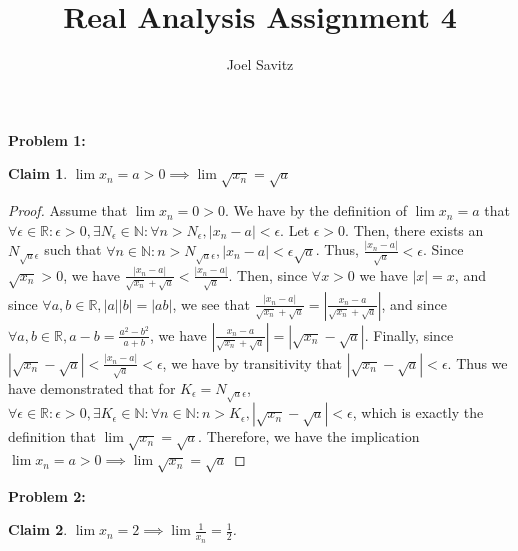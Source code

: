 \documentclass{article}
\title{Real Analysis Assignment 4}
\author{Joel Savitz}
\newcommand{\reals}{\ensuremath{\mathbb{R}}}
\newcommand{\nats}{\ensuremath{\mathbb{N}}}
\newcommand{\eps}{\ensuremath{\epsilon}}
\newtheorem{clm}{Claim}
\begin{document}
\maketitle

\textbf{Problem 1:}

\begin{clm}
	$\lim x_n = a > 0 \implies \lim \sqrt{x_n} = \sqrt{a}$
\end{clm}

\begin{proof}
	Assume that $\lim x_n = 0 > 0$.
	We have by the definition of $\lim x_n = a$
	that $\forall \eps \in \reals : \eps > 0, \exists N_\eps \in \nats: \forall n > N_\eps, | x_n - a | < \eps$.
	Let $\eps > 0$.
	Then, there exists an $N_{\sqrt{a}\eps}$
	such that $\forall n \in \nats : n > N_{\sqrt{a}\eps}, | x_n - a | < \eps \sqrt{a}$.
	Thus, $\frac{|x_n - a|}{\sqrt{a}} < \eps$.
	Since $\sqrt{x_n} > 0$, we have 
	$\frac{|x_n - a|}{\sqrt{x_n} + \sqrt{a}} < \frac{|x_n - a|}{\sqrt{a}}$.
	Then, since $\forall x > 0$ we have $|x| = x$,
	and since $\forall a,b \in \reals, |a||b| = |ab|$,
	we see that 
	$\frac{|x_n - a|}{\sqrt{x_n} + \sqrt{a}} = |\frac{x_n - a}{\sqrt{x_n} + \sqrt{a}}|$,
	and since $\forall a, b \in \reals, a - b = \frac{a^2 - b^2}{a + b}$,
	we have $|\frac{x_n - a}{\sqrt{x_n} + \sqrt{a}}| = | \sqrt{x_n} - \sqrt{a} |$.
	Finally, since $| \sqrt{x_n} - \sqrt{a} | < \frac{|x_n - a|}{\sqrt{a}}	< \eps$,
	we have by transitivity that $| \sqrt{x_n} - \sqrt{a} | < \eps$.
	Thus we have demonstrated that
	for $K_\eps = N_{\sqrt{a}\eps}$,
	$\forall \eps \in \reals: \eps > 0, \exists K_\eps \in \nats: \forall n \in \nats: n > K_\eps,
	| \sqrt{x_n} - \sqrt{a} | < \eps$,
	which is exactly the definition that $\lim \sqrt{x_n} = \sqrt{a}$.
	Therefore, we have the implication $\lim x_n = a > 0 \implies \lim \sqrt{x_n} = \sqrt{a}$
\end{proof}

\textbf{Problem 2:}

\begin{clm}
	$\lim x_n = 2 \implies \lim \frac{1}{x_n} = \frac{1}{2}$.
\end{clm}
\end{document}
